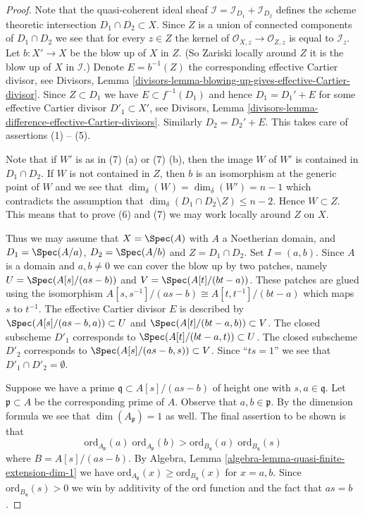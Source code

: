 \begin{proof}
Note that the quasi-coherent ideal sheaf
$\mathcal{I} = \mathcal{I}_{D_1} + \mathcal{I}_{D_2}$
defines the scheme theoretic intersection $D_1 \cap D_2 \subset X$.
Since $Z$ is a union of connected components of $D_1 \cap D_2$
we see that for every $z \in Z$ the kernel of
$\mathcal{O}_{X, z} \to \mathcal{O}_{Z, z}$ is equal to $\mathcal{I}_z$.
Let $b : X' \to X$ be the blow up of $X$ in $Z$. (So Zariski locally
around $Z$ it is the blow up of $X$ in $\mathcal{I}$.)
Denote $E = b^{-1}(Z)$ the corresponding effective Cartier divisor, see
Divisors,
Lemma \ref{divisors-lemma-blowing-up-gives-effective-Cartier-divisor}.
Since $Z \subset D_1$ we have $E \subset f^{-1}(D_1)$ and hence
$D_1 = D_1' + E$ for some effective Cartier divisor $D'_1 \subset X'$,
see Divisors, Lemma \ref{divisors-lemma-difference-effective-Cartier-divisors}.
Similarly $D_2 = D_2' + E$. This takes care of assertions (1) -- (5).

\medskip\noindent
Note that if $W'$ is as in (7) (a) or (7) (b), then the image $W$
of $W'$ is contained in $D_1 \cap D_2$. If $W$ is not contained in
$Z$, then $b$ is an isomorphism at the generic point of $W$ and
we see that $\dim_\delta(W) = \dim_\delta(W') = n - 1$ which
contradicts the assumption that
$\dim_\delta(D_1 \cap D_2 \setminus Z) \leq n - 2$.
Hence $W \subset Z$. This means that
to prove (6) and (7) we may work locally around $Z$ on $X$.

\medskip\noindent
Thus we may assume that $X = \Spec(A)$ with
$A$ a Noetherian domain, and $D_1 = \Spec(A/a)$,
$D_2 = \Spec(A/b)$ and $Z = D_1 \cap D_2$.
Set $I = (a, b)$. Since $A$ is a domain and $a, b \not = 0$ we can
cover the blow up by two patches, namely
$U = \Spec(A[s]/(as - b))$ and $V = \Spec(A[t]/(bt -a))$.
These patches are glued using the isomorphism
$A[s, s^{-1}]/(as - b) \cong A[t, t^{-1}]/(bt - a)$
which maps $s$ to $t^{-1}$.
The effective Cartier divisor $E$ is described by
$\Spec(A[s]/(as - b, a)) \subset U$ and
$\Spec(A[t]/(bt - a, b)) \subset V$.
The closed subscheme $D'_1$ corresponds to
$\Spec(A[t]/(bt - a, t)) \subset U$.
The closed subscheme $D'_2$ corresponds to
$\Spec(A[s]/(as -b, s)) \subset V$.
Since ``$ts = 1$'' we see that $D'_1 \cap D'_2 = \emptyset$.

\medskip\noindent
Suppose we have a prime $\mathfrak q \subset A[s]/(as - b)$
of height one with $s, a \in \mathfrak q$.
Let $\mathfrak p \subset A$ be the corresponding prime of $A$.
Observe that $a, b \in \mathfrak p$.
By the dimension formula we see that $\dim(A_{\mathfrak p}) = 1$
as well. The final assertion to be shown is that
$$
\text{ord}_{A_{\mathfrak p}}(a)
\;
\text{ord}_{A_{\mathfrak p}}(b)
>
\text{ord}_{B_{\mathfrak q}}(a)
\;
\text{ord}_{B_{\mathfrak q}}(s)
$$
where $B = A[s]/(as - b)$. By
Algebra, Lemma \ref{algebra-lemma-quasi-finite-extension-dim-1}
we have $\text{ord}_{A_{\mathfrak p}}(x) \geq \text{ord}_{B_{\mathfrak q}}(x)$
for $x = a, b$. Since $\text{ord}_{B_{\mathfrak q}}(s) > 0$ we win
by additivity of the $\text{ord}$ function and the fact that
$as = b$.
\end{proof}


